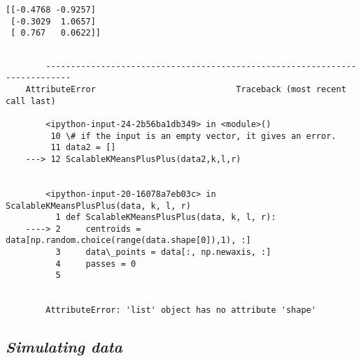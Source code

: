 \documentclass{article}
\begin{document}
    \begin{Verbatim}[commandchars=\\\{\}]
[[-0.4768 -0.9257]
 [-0.3029  1.0657]
 [ 0.767   0.0622]]
    \end{Verbatim}

    \begin{Verbatim}[commandchars=\\\{\}]

        ---------------------------------------------------------------------------
    AttributeError                            Traceback (most recent call last)

        <ipython-input-24-2b56ba1db349> in <module>()
         10 \# if the input is an empty vector, it gives an error.
         11 data2 = []
    ---> 12 ScalableKMeansPlusPlus(data2,k,l,r)
    

        <ipython-input-20-16078a7eb03c> in ScalableKMeansPlusPlus(data, k, l, r)
          1 def ScalableKMeansPlusPlus(data, k, l, r):
    ----> 2     centroids = data[np.random.choice(range(data.shape[0]),1), :]
          3     data\_points = data[:, np.newaxis, :]
          4     passes = 0
          5 


        AttributeError: 'list' object has no attribute 'shape'

    \end{Verbatim}

    \subsection{\emph{Simulating data}}\label{simulating-data}
\end{document}
